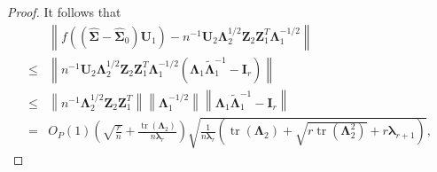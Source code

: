 \documentclass[12pt]{article} %
\DeclareMathOperator{\mytr}{tr}
\newcommand{\bZ}{\mathbf{Z}}
\newcommand{\bI}{\mathbf{I}}
\newcommand{\bU}{\mathbf{U}}
\newcommand{\bfsym}[1]{\ensuremath{\boldsymbol{#1}}}
\def\blambda {\bfsym {\lambda}}
\def\bLambda {\bfsym {\Lambda}}
\def\bSigma {\bfsym {\Sigma}}
\theoremstyle{definition}
\begin{document}
\begin{appendices}
\begin{proof}
It follows that
    \begin{equation*}
        \begin{split}
                &\left\|f((\hat{\bSigma}-\hat{\bSigma}_0) \bU_{1})
                -
                n^{-1} \bU_2 \bLambda_2^{1/2} \bZ_2 \bZ_1^T \bLambda_1^{-1/2}  \right\|
                \\
                \leq&
                \left\|
                n^{-1} \bU_2 \bLambda_2^{1/2} \bZ_2 \bZ_1^T \bLambda_1^{-1/2} 
                \left(
                \bLambda_1\tilde{\bLambda}_1^{-1}- \bI_r
                \right)
                \right\|
                \\
                \leq &
                \left\|
                n^{-1} \bLambda_2^{1/2} \bZ_2 \bZ_1^T
                \right\|
                \left\|
                \bLambda_1^{-1/2} 
                \right\|
                \left\|
                \bLambda_1\tilde{\bLambda}_1^{-1}-\bI_r
                \right\|
                \\
                =&
                O_P(1)
                \left(\sqrt{\frac{r}{n}}
    +\frac{\mytr(\bLambda_2)}{n\blambda_r}
    \right)
                \sqrt{ \frac{1}{n\blambda_r}\left( \mytr(\bLambda_2)
            +\sqrt{r\mytr\left(\bLambda_2^2\right)}
            +r\blambda_{r+1}
    \right)},
        \end{split}
    \end{equation*}

\end{proof}
\end{appendices}
\end{document}
